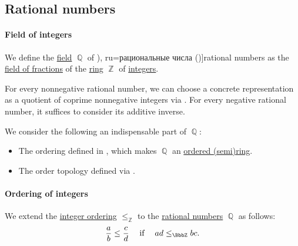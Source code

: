 \subsection{Rational numbers}\label{subsec:rational_numbers}

\paragraph{Field of integers}

\begin{definition}\label{def:rational_numbers}
  We define the \hyperref[def:field]{field} \( \BbbQ \) of \term[bg=рационални числа (\cite[sec. 1.1.2]{Соскова2015}), ru=рациональные числа (\cite[sec. 15.1]{Тыртышников2007})]{rational numbers} as the \hyperref[thm:field_of_fractions]{field of fractions} of the \hyperref[def:ring]{ring} \( \BbbZ \) of \hyperref[def:integers]{integers}.
\end{definition}
\begin{comments}
  \item For every nonnegative rational number, we can choose a concrete representation as a quotient of coprime nonnegative integers via . For every negative rational number, it suffices to consider its additive inverse.

  \item We consider the following an indispensable part of \( \BbbQ \):
  \begin{itemize}
    \item The ordering defined in , which makes \( \BbbQ \) an \hyperref[def:ordered_semiring]{ordered (semi)ring}.
    \item The order topology defined via .
  \end{itemize}
\end{comments}

\paragraph{Ordering of integers}

\begin{definition}\label{def:rational_number_ordering}
  We extend the \hyperref[def:integer_ordering]{integer ordering} \( \leq_\BbbZ \) to the \hyperref[def:rational_numbers]{rational numbers} \( \BbbQ \) as follows:
  \begin{equation*}
    \frac a b \leq \frac c d \quad\T{if}\quad ad \leq_\BbbZ bc.
  \end{equation*}
\end{definition}

